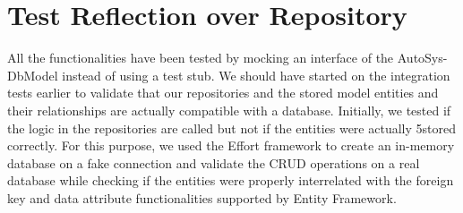 \section{Test Reflection over Repository}
All the functionalities have been tested by mocking an interface of the AutoSys-
DbModel instead of using a test stub. We should have started on the integration
tests earlier to validate that our repositories and the stored model entities and
their relationships are actually compatible with a database. Initially, we tested
if the logic in the repositories are called but not if the entities were actually
5stored correctly. For this purpose, we used the Effort framework to create an
in-memory database on a fake connection and validate the CRUD operations on
a real database while checking if the entities were properly interrelated with the
foreign key and data attribute functionalities supported by Entity Framework.\\